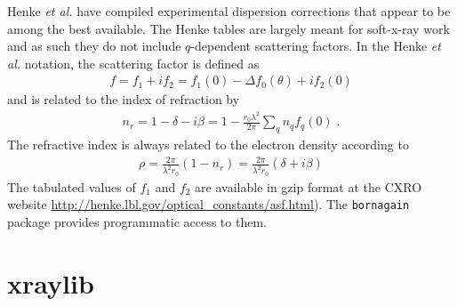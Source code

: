 \documentclass[11pt]{article}
\begin{document}
Henke {\itshape et al.}\cite{henkeXRayInteractionsPhotoabsorption1993} have compiled experimental dispersion corrections that appear to be among the best available.  The Henke tables are largely meant for soft-x-ray work and as such they do not include $q$-dependent scattering factors.
In the Henke {\itshape et al.}\cite{henkeXRayInteractionsPhotoabsorption1993} notation, the scattering factor is defined as
\begin{align}
f=f_1+if_2=f_1(0)-\Delta f_0(\theta)+if_2(0)
\end{align}
and is related to the index of refraction by
\begin{align}
n_r = 1 - \delta -i\beta = 1 -\frac{r_0\lambda^2}{2\pi}\sum_q n_qf_q(0) \; .
\end{align}
The refractive index is always related to the electron density according to
\begin{align}
\rho =  \frac{2\pi}{\lambda^2 r_0 } \left( 1 - n_r \right) = \frac{2\pi}{\lambda^2 r_0 } \left( \delta + i \beta \right) 
\end{align}
The tabulated values of $f_1$ and $f_2$ are available in gzip format at the CXRO website \url{http://henke.lbl.gov/optical_constants/asf.html}).  The \texttt{bornagain} package provides programmatic access to them.


\section{xraylib}
\end{document}
